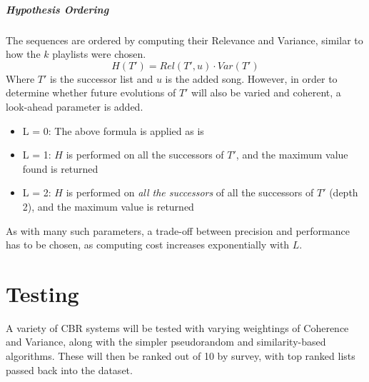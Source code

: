 \documentclass[a4paper, 12pt]{report}
\begin{document}
\paragraph{Hypothesis Ordering}
The sequences are ordered by computing their Relevance and Variance, similar to how the \(k\) playlists were chosen. 
\[H(T') = Rel(T', u) \cdot Var(T')\]
Where \(T'\) is the successor list and \(u\) is the added song. 
However, in order to determine whether future evolutions of \(T'\) will also be varied and coherent, a look-ahead parameter is added.
\begin{itemize}
    \item L = 0: The above formula is applied as is
    \item L = 1: \(H\) is performed on all the successors of \(T'\), and the maximum value found is returned 
    \item L = 2: \(H\) is performed on \emph{all the successors} of all the successors of \(T'\) (depth 2), and the maximum value is returned
\end{itemize}
As with many such parameters, a trade-off between precision and performance has to be chosen, as computing cost increases exponentially with \(L\).



\chapter{Testing}
A variety of CBR systems will be tested with varying weightings of Coherence and Variance, along with the simpler pseudorandom and similarity-based algorithms.
These will then be ranked out of 10 by survey, with top ranked lists passed back into the dataset.

\printbibliography
\end{document}
